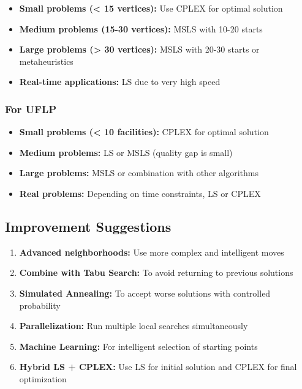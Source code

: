\documentclass[12pt,a4paper]{article}
\begin{document}
\begin{itemize}
    \item \textbf{Small problems (< 15 vertices):} Use CPLEX for optimal solution
    \item \textbf{Medium problems (15-30 vertices):} MSLS with 10-20 starts
    \item \textbf{Large problems (> 30 vertices):} MSLS with 20-30 starts or metaheuristics
    \item \textbf{Real-time applications:} LS due to very high speed
\end{itemize}

\subsubsection{For UFLP}

\begin{itemize}
    \item \textbf{Small problems (< 10 facilities):} CPLEX for optimal solution
    \item \textbf{Medium problems:} LS or MSLS (quality gap is small)
    \item \textbf{Large problems:} MSLS or combination with other algorithms
    \item \textbf{Real problems:} Depending on time constraints, LS or CPLEX
\end{itemize}

\subsection{Improvement Suggestions}

\begin{enumerate}
    \item \textbf{Advanced neighborhoods:} Use more complex and intelligent moves
    \item \textbf{Combine with Tabu Search:} To avoid returning to previous solutions
    \item \textbf{Simulated Annealing:} To accept worse solutions with controlled probability
    \item \textbf{Parallelization:} Run multiple local searches simultaneously
    \item \textbf{Machine Learning:} For intelligent selection of starting points
    \item \textbf{Hybrid LS + CPLEX:} Use LS for initial solution and CPLEX for final optimization
\end{enumerate}
\end{document}

